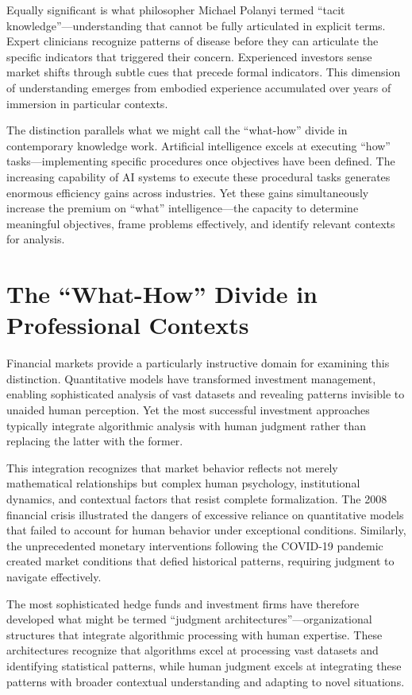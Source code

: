 \documentclass[
  Letterpaper,
]{scrbook}
\begin{document}
Equally significant is what philosopher Michael Polanyi termed ``tacit
knowledge''---understanding that cannot be fully articulated in explicit
terms. Expert clinicians recognize patterns of disease before they can
articulate the specific indicators that triggered their concern.
Experienced investors sense market shifts through subtle cues that
precede formal indicators. This dimension of understanding emerges from
embodied experience accumulated over years of immersion in particular
contexts.

The distinction parallels what we might call the ``what-how'' divide in
contemporary knowledge work. Artificial intelligence excels at executing
``how'' tasks---implementing specific procedures once objectives have
been defined. The increasing capability of AI systems to execute these
procedural tasks generates enormous efficiency gains across industries.
Yet these gains simultaneously increase the premium on ``what''
intelligence---the capacity to determine meaningful objectives, frame
problems effectively, and identify relevant contexts for analysis.

\section{The ``What-How'' Divide in Professional
Contexts}\label{the-what-how-divide-in-professional-contexts}

Financial markets provide a particularly instructive domain for
examining this distinction. Quantitative models have transformed
investment management, enabling sophisticated analysis of vast datasets
and revealing patterns invisible to unaided human perception. Yet the
most successful investment approaches typically integrate algorithmic
analysis with human judgment rather than replacing the latter with the
former.

This integration recognizes that market behavior reflects not merely
mathematical relationships but complex human psychology, institutional
dynamics, and contextual factors that resist complete formalization. The
2008 financial crisis illustrated the dangers of excessive reliance on
quantitative models that failed to account for human behavior under
exceptional conditions. Similarly, the unprecedented monetary
interventions following the COVID-19 pandemic created market conditions
that defied historical patterns, requiring judgment to navigate
effectively.

The most sophisticated hedge funds and investment firms have therefore
developed what might be termed ``judgment
architectures''---organizational structures that integrate algorithmic
processing with human expertise. These architectures recognize that
algorithms excel at processing vast datasets and identifying statistical
patterns, while human judgment excels at integrating these patterns with
broader contextual understanding and adapting to novel situations.
\end{document}
